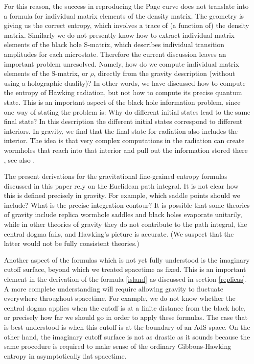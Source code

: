 For this reason, the success in reproducing the Page curve does not translate into a formula for individual matrix elements of the density matrix.  The geometry is giving us the correct entropy, which involves a trace of (a function of) the density matrix. 
Similarly we do not presently know how to extract 
  individual matrix elements of the black hole S-matrix, which describes individual transition amplitudes for each microstate. Therefore the current discussion leaves an important problem unresolved. Namely, how do we compute individual matrix elements of the S-matrix, or $\rho$, directly from the gravity description (without using a holographic duality)? In other words, we have discussed how to compute the entropy of Hawking radiation, but not how to compute its precise quantum  state. This is an important aspect of the black hole information problem, since one way of stating the problem is: Why do different initial states lead to the same final state? In this description the different initial states correspond to different interiors. In gravity, we find that the final state for radiation also includes the interior.  
  The idea is that very complex computations in the radiation can create wormholes that reach into that interior and pull out the information stored there \cite{Penington:2019kki}, 
  see also \cite{Maldacena:2013xja,Gao:2016bin}.

 
The present derivations for the 
  gravitational fine-grained entropy formulas discussed in this paper rely on the Euclidean path integral. It is not clear how this is defined precisely in gravity. For example, which saddle points should we include? What is the precise integration contour? It is possible that some theories of gravity include replica wormhole saddles and black holes evaporate unitarily, while in other theories of gravity they do not contribute to the path integral, the central dogma fails, and Hawking's picture is accurate. (We suspect that the latter would not be fully consistent theories.)

 
Another aspect of the formulas which is not yet fully understood is the imaginary cutoff surface, beyond which we treated spacetime as fixed. This is an important element in the derivation of the formula \eqref{island}  as discussed in section \ref{replicas}.   
 A more complete understanding will require allowing gravity to fluctuate everywhere throughout spacetime. For example, we do not know whether the central dogma applies when the cutoff is at a finite distance from the black hole, or precisely how far we should go in order to apply these formulas. The case that is best understood is when this cutoff is at the boundary of an AdS space.   On the other hand, the imaginary cutoff surface is not as drastic as it sounds because the same procedure is required to make sense of the ordinary Gibbons-Hawking entropy in asymptotically flat spacetime.



